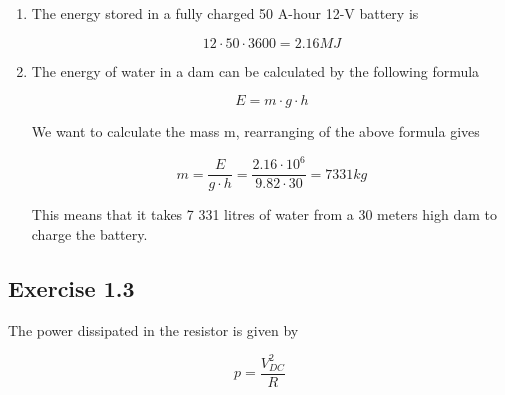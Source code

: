 \documentclass[]{article}
\begin{document}
\begin{enumerate}[label=(\alph*)]
	\item The energy stored in a fully charged 50 A-hour 12-V battery is

	\begin{equation*}
		12 \cdot 50 \cdot 3600 = 2.16 MJ
	\end{equation*}

	\item The energy of water in a dam can be calculated by the following formula
		
	\begin{equation*}
		E =  m \cdot g \cdot h
	\end{equation*}

	We want to calculate the mass m, rearranging of the above formula gives
	
	\begin{equation*}
		m = \dfrac{E}{g \cdot h} = \dfrac{2.16 \cdot 10^6}{9.82 \cdot 30} = 7331 kg
	\end{equation*}
	
	This means that it takes 7 331 litres of water from a 30 meters high dam to charge the battery. 
\end{enumerate}

\subsection*{Exercise 1.3}

The power dissipated in the resistor is given by

\begin{equation*}
	p =  \dfrac{V_{DC}^{2}}{R}
\end{equation*}
	
\end{document}
